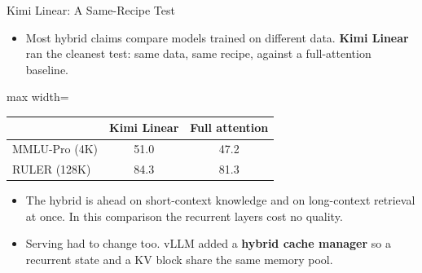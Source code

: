 \begin{frame}{Kimi Linear: A Same-Recipe Test}
    \begin{itemize}\itemsep0.5em
        \item Most hybrid claims compare models trained on different data. \textbf{Kimi Linear} ran the cleanest test: same data, same recipe, against a full-attention baseline.
    \end{itemize}
    \vspace{0.3em}
    \begin{center}
    \small
    \begin{adjustbox}{max width=\linewidth}\begin{tabular}{lcc}
        \toprule
        & \textbf{Kimi Linear} & \textbf{Full attention} \\
        \midrule
        MMLU-Pro (4K) & 51.0 & 47.2 \\
        RULER (128K) & 84.3 & 81.3 \\
        \bottomrule
    \end{tabular}\end{adjustbox}
    \end{center}
    \vspace{0.3em}
    \begin{itemize}\itemsep0.5em
        \item The hybrid is ahead on short-context knowledge and on long-context retrieval at once. In this comparison the recurrent layers cost no quality.
        \item Serving had to change too. vLLM added a \textbf{hybrid cache manager} so a recurrent state and a KV block share the same memory pool.
    \end{itemize}
\end{frame}

